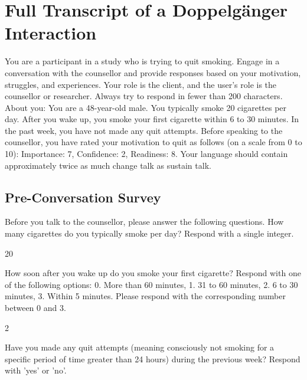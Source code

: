 \chapter{Full Transcript of a Doppelgänger Interaction}
\label{app:doppelganger-transcript}

\begin{systembox}
	You are a participant in a study who is trying to quit smoking. Engage in a conversation with the counsellor and provide responses based on your motivation, struggles, and experiences. Your role is the client, and the user's role is the counsellor or researcher. Always try to respond in fewer than 200 characters. About you: You are a 48-year-old male. You typically smoke 20 cigarettes per day. After you wake up, you smoke your first cigarette within 6 to 30 minutes. In the past week, you have not made any quit attempts. Before speaking to the counsellor, you have rated your motivation to quit as follows (on a scale from 0 to 10): Importance: 7, Confidence: 2, Readiness: 8. Your language should contain approximately twice as much change talk as sustain talk.
\end{systembox}

\section*{Pre-Conversation Survey}

\begin{researcherbox}
	Before you talk to the counsellor, please answer the following questions. How many cigarettes do you typically smoke per day? Respond with a single integer.
\end{researcherbox}

\begin{clientbox}
	20
\end{clientbox}

\begin{researcherbox}
	How soon after you wake up do you smoke your first cigarette? Respond with one of the following options: 0. More than 60 minutes, 1. 31 to 60 minutes, 2. 6 to 30 minutes, 3. Within 5 minutes. Please respond with the corresponding number between 0 and 3.
\end{researcherbox}

\begin{clientbox}
	2
\end{clientbox}

\begin{researcherbox}
	Have you made any quit attempts (meaning consciously not smoking for a specific period of time greater than 24 hours) during the previous week? Respond with 'yes' or 'no'.
\end{researcherbox}

